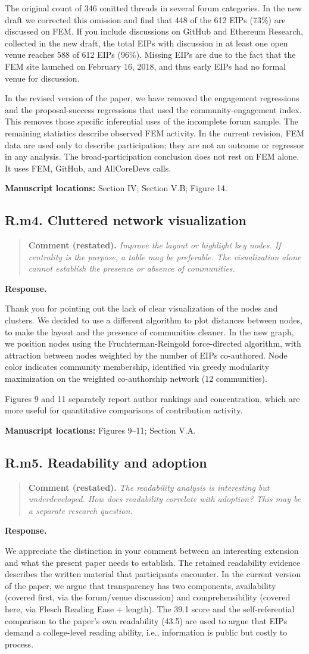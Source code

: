 \documentclass[11pt,letterpaper]{article}
\newcommand{\point}[3]{%
  \Needspace{7\baselineskip}
  \subsection*{#1. #2}\phantomsection\label{pt:#1}%
  \begin{quote}\small\textbf{Comment (restated).} \textit{#3}\end{quote}%
  \textbf{Response.}\enspace\ignorespaces}
\newcommand{\locations}[1]{\par{\small\textbf{Manuscript locations:} #1.}\par}
\begin{document}
The original count of 346 omitted threads in several forum categories. In the new draft we corrected this omission and find that 448 of the 612 EIPs (73\%) are discussed on FEM. If you include discussions on GitHub and Ethereum Research, collected in the new draft, the total EIPs with discussion in at least one open venue reaches 588 of 612 EIPs (96\%). Missing EIPs are due to the fact that the FEM site launched on February 16, 2018, and thus early EIPs had no formal venue for discussion.

In the revised version of the paper, we have removed the engagement regressions and the proposal-success regressions that used the community-engagement index. This removes those specific inferential uses of the incomplete forum sample. The remaining statistics describe observed FEM activity. In the current revision, FEM data are used only to describe participation; they are not an outcome or regressor in any analysis. The broad-participation conclusion does not rest on FEM alone. It uses FEM, GitHub, and AllCoreDevs calls.



\locations{Section IV; Section V.B; Figure 14}

\point{R.m4}{Cluttered network visualization}{Improve the layout or highlight key nodes. If centrality is the purpose, a table may be preferable. The visualization alone cannot establish the presence or absence of communities.}

Thank you for pointing out the lack of clear visualization of the nodes and clusters. We decided to use a different algorithm to plot distances between nodes, to make the layout and the presence of communities cleaner. In the new graph, we position nodes using the Fruchterman-Reingold force-directed algorithm, with attraction between nodes weighted by the number of EIPs co-authored. Node color indicates community membership, identified via greedy modularity maximization on the weighted co-authorship network (12 communities). 

Figures 9 and 11 separately report author rankings and concentration, which are more useful for quantitative comparisons of contribution activity.


\locations{Figures 9--11; Section V.A}

\point{R.m5}{Readability and adoption}{The readability analysis is interesting but underdeveloped. How does readability correlate with adoption? This may be a separate research question.}

We appreciate the distinction in your comment between an interesting extension and what the present paper needs to establish. The retained readability evidence describes the written material that participants encounter. In the current version of the paper, we argue that transparency has two components, availability (covered first, via the forum/venue discussion) and comprehensibility (covered here, via Flesch Reading Ease + length). The 39.1 score and the self-referential comparison to the paper’s own readability (43.5) are used to argue that EIPs demand a college-level reading ability, i.e., information is public but costly to process.
\end{document}
